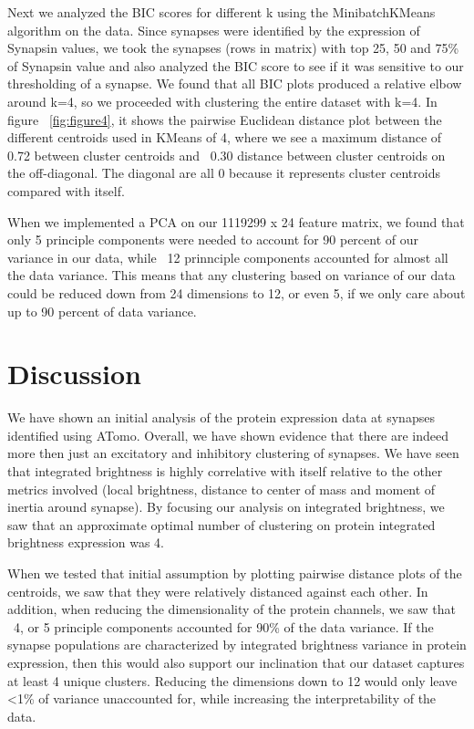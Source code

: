 \documentclass{article}
\begin{document}
Next we analyzed the BIC scores for different k using the MinibatchKMeans algorithm on the data. Since synapses were identified by the expression of Synapsin values, we took the synapses (rows in matrix) with top 25, 50 and 75\% of Synapsin value and also analyzed the BIC score to see if it was sensitive to our thresholding of a synapse. We found that all BIC plots produced a relative elbow around k=4, so we proceeded with clustering the entire dataset with k=4. In figure ~\ref{fig:figure4}, it shows the pairwise Euclidean distance plot between the different centroids used in KMeans of 4, where we see a maximum distance of 0.72 between cluster centroids and ~0.30 distance between cluster centroids on the off-diagonal. The diagonal are all 0 because it represents cluster centroids compared with itself. 

When we implemented a PCA on our 1119299 x 24 feature matrix, we found that only 5 principle components were needed to account for 90 percent of our variance in our data, while ~12 prinnciple components accounted for almost all the data variance. This means that any clustering based on variance of our data could be reduced down from 24 dimensions to 12, or even 5, if we only care about up to 90 percent of data variance. 

\section{Discussion}
\label{discussion}
We have shown an initial analysis of the protein expression data at synapses identified using ATomo. Overall, we have shown evidence that there are indeed more then just an excitatory and inhibitory clustering of synapses. We have seen that integrated brightness is highly correlative with itself relative to the other metrics involved (local brightness, distance to center of mass and moment of inertia around synapse). By focusing our analysis on integrated brightness, we saw that an approximate optimal number of clustering on protein integrated brightness expression was 4.

When we tested that initial assumption by plotting pairwise distance plots of the centroids, we saw that they were relatively distanced against each other. In addition, when reducing the dimensionality of the protein channels, we saw that ~4, or 5 principle components accounted for 90\% of the data variance. If the synapse populations are characterized by integrated brightness variance in protein expression, then this would also support our inclination that our dataset captures at least 4 unique clusters. Reducing the dimensions down to 12 would only leave <1\% of variance unaccounted for, while increasing the interpretability of the data.
\end{document}
